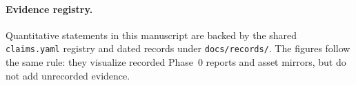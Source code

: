 \paragraph{Evidence registry.}
Quantitative statements in this manuscript are backed by the shared \texttt{claims.yaml} registry and dated records under \texttt{docs/records/}.
The figures follow the same rule: they visualize recorded Phase~0 reports and asset mirrors, but do not add unrecorded evidence.
